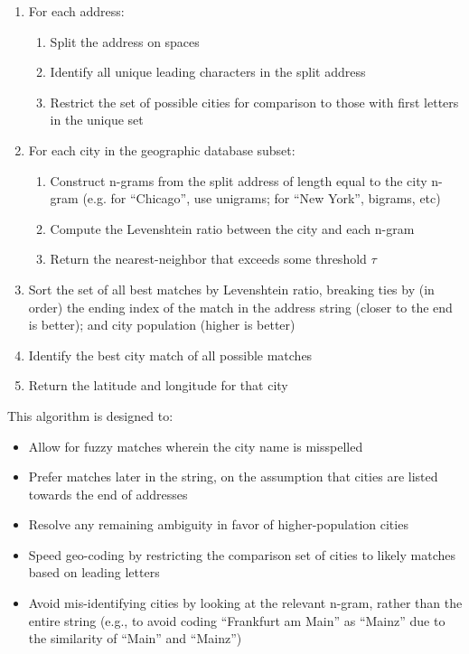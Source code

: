 \documentclass[11pt]{article}
\begin{document}
\begin{enumerate}
\item For each address:
  \begin{enumerate}
  \item Split the address on spaces
  \item Identify all unique leading characters in the split address
  \item Restrict the set of possible cities for comparison to those
    with first letters in the unique set
  \end{enumerate}
\item For each city in the geographic database subset:
  \begin{enumerate}
  \item Construct n-grams from the split address of length equal to
    the city n-gram (e.g. for ``Chicago'', use unigrams; for ``New
    York'', bigrams, etc)
  \item Compute the Levenshtein ratio between the city and each n-gram
  \item Return the nearest-neighbor that exceeds some threshold $\tau$
  \end{enumerate}
\item Sort the set of all best matches by Levenshtein ratio, breaking
  ties by (in order) the ending index of the match in the address
  string (closer to the end is better); and city population (higher is
  better)
\item Identify the best city match of all possible matches
\item Return the latitude and longitude for that city
\end{enumerate}

This algorithm is designed to:
\begin{itemize}
\item Allow for fuzzy matches wherein the city name is misspelled
\item Prefer matches later in the string, on the assumption that
  cities are listed towards the end of addresses
\item Resolve any remaining ambiguity in favor of higher-population cities
\item Speed geo-coding by restricting the comparison set of cities to
  likely matches based on leading letters
\item Avoid mis-identifying cities by looking at the relevant n-gram,
  rather than the entire string (e.g., to avoid coding ``Frankfurt am
  Main'' as ``Mainz'' due to the similarity of ``Main'' and ``Mainz'')
\end{itemize}
\end{document}
